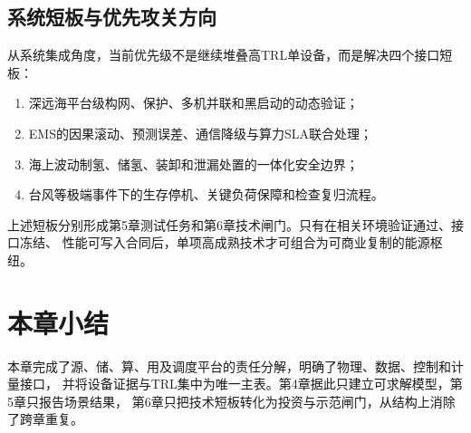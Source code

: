 \subsection{系统短板与优先攻关方向}

从系统集成角度，当前优先级不是继续堆叠高TRL单设备，而是解决四个接口短板：
\begin{enumerate}
  \item 深远海平台级构网、保护、多机并联和黑启动的动态验证；
  \item EMS的因果滚动、预测误差、通信降级与算力SLA联合处理；
  \item 海上波动制氢、储氢、装卸和泄漏处置的一体化安全边界；
  \item 台风等极端事件下的生存停机、关键负荷保障和检查复归流程。
\end{enumerate}

上述短板分别形成第5章测试任务和第6章技术闸门。只有在相关环境验证通过、接口冻结、
性能可写入合同后，单项高成熟技术才可组合为可商业复制的能源枢纽。

\section*{本章小结}

本章完成了源、储、算、用及调度平台的责任分解，明确了物理、数据、控制和计量接口，
并将设备证据与TRL集中为唯一主表。第4章据此只建立可求解模型，第5章只报告场景结果，
第6章只把技术短板转化为投资与示范闸门，从结构上消除了跨章重复。

